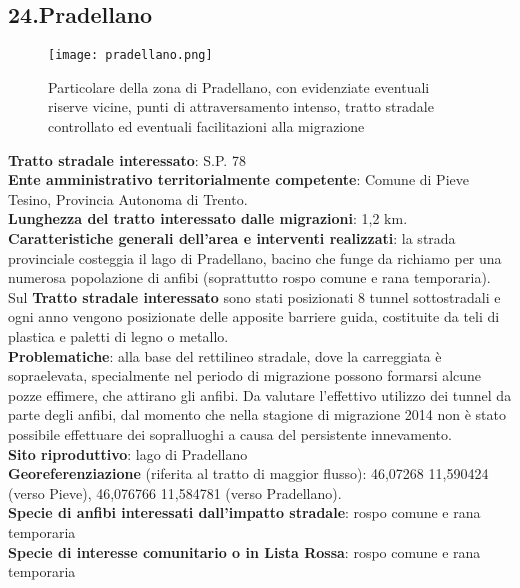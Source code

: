 \documentclass[11pt,a4paper,twoside]{memoir}
\begin{document}
\newpage
\begin{tcolorbox}[breakable,colback=white,colframe=red,width=10cm]
\subsection{24.Pradellano}
\end{tcolorbox}

\begin{figure}[H]
\label{fig:map_pradellano}
\centering
  \texttt{[image: pradellano.png]}
\caption{Particolare della zona di Pradellano, con evidenziate eventuali riserve vicine, punti di attraversamento intenso, tratto stradale controllato ed eventuali facilitazioni alla migrazione}
\end{figure}

\textbf{Tratto stradale interessato}: S.P. 78  \\
\textbf{Ente amministrativo territorialmente competente}: Comune di Pieve Tesino, Provincia Autonoma di Trento. \\
\textbf{Lunghezza del tratto interessato dalle migrazioni}: 1,2 km. \\
\textbf{Caratteristiche generali dell’area e interventi realizzati}: la strada provinciale costeggia il lago di Pradellano, bacino che funge da richiamo per una numerosa popolazione di anfibi (soprattutto rospo comune e rana temporaria). Sul \textbf{Tratto stradale interessato} sono stati posizionati 8 tunnel sottostradali e ogni anno vengono posizionate delle apposite barriere guida, costituite da teli di plastica e paletti di legno o metallo. \\
\textbf{Problematiche}: alla base del rettilineo stradale, dove la carreggiata è sopraelevata, specialmente nel periodo di migrazione possono formarsi alcune pozze effimere, che attirano gli anfibi. Da valutare l'effettivo utilizzo dei tunnel da parte degli anfibi, dal momento che nella stagione di migrazione 2014 non è stato possibile effettuare dei sopralluoghi a causa del persistente innevamento. \\
\textbf{Sito riproduttivo}: lago di Pradellano \\
\textbf{Georeferenziazione} (riferita al tratto di maggior flusso): 46,07268 11,590424 (verso Pieve), 46,076766 11,584781 (verso Pradellano). \\
\textbf{Specie di anfibi interessati dall’impatto stradale}: rospo comune e rana temporaria \\
\textbf{Specie di interesse comunitario o in Lista Rossa}: rospo comune e rana temporaria \\
\end{document}
